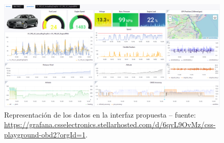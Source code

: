 \begin{enumerate}[label=\textbf{\texttt{RU-\arabic*}}]
        \begin{figure}[H]
            \centering
            \includegraphics[width=\linewidth]{images/data-ui.png}
            \caption{Representación de los datos en la interfaz propuesta -- fuente: \url{https://grafana.csselectronics.stellarhosted.com/d/6qvL9OvMz/css-playground-obd2?orgId=1}.}
            \label{fig:data-ui}
        \end{figure}
\end{enumerate}